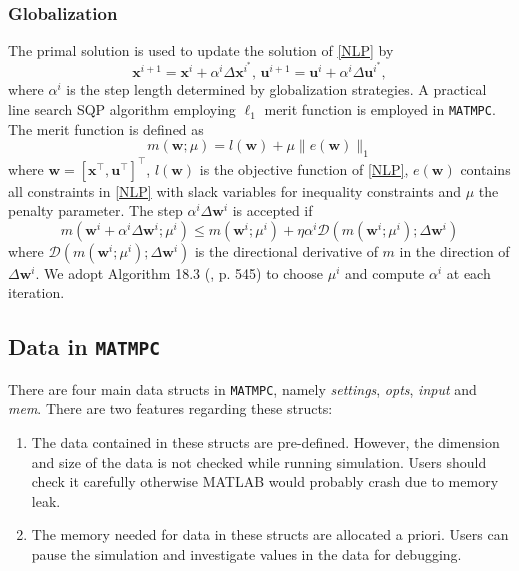 \documentclass{article}
\newcommand{\software}[1]{{\tt#1}}
\newcommand{\norm}[1]{\lVert#1\rVert}
\newcommand{\alert}[1]{{\textit{#1}}}
\begin{document}
\subsubsection{Globalization}
The primal solution is used to update the solution of \eqref{NLP} by
\begin{equation}\label{solution update}
\mathbf{x}^{i+1} = \mathbf{x}^{i} + \alpha^i \Delta\mathbf{x}^{i^*}, \, \mathbf{u}^{i+1} = \mathbf{u}^{i} + \alpha^i \Delta\mathbf{u}^{i^*},
\end{equation}
where $\alpha^i$ is the step length determined by globalization strategies. A practical line search SQP algorithm employing $\ell_1$ merit function \cite{nocedal2006numerical} is employed in \software{MATMPC}. The merit function is defined as
\begin{equation}
m(\mathbf{w};\mu)=l(\mathbf{w})+\mu\norm{e(\mathbf{w})}_1
\end{equation}
where $\mathbf{w}=[\mathbf{x}^\top,\mathbf{u}^\top]^\top$, $l(\mathbf{w})$ is the objective function of \eqref{NLP}, $e(\mathbf{w})$ contains all constraints in \eqref{NLP} with slack variables for inequality constraints and $\mu$ the penalty parameter. The step $\alpha^i\Delta \mathbf{w}^i$ is accepted if 
\begin{equation}
m(\mathbf{w}^i+\alpha^i\Delta \mathbf{w}^i;\mu^i)\leq m(\mathbf{w}^i;\mu^i)+\eta\alpha^i\mathcal{D}(m(\mathbf{w}^i;\mu^i);\Delta \mathbf{w}^i)
\end{equation}
where $\mathcal{D}(m(\mathbf{w}^i;\mu^i);\Delta \mathbf{w}^i)$ is the directional derivative of $m$ in the direction of $\Delta \mathbf{w}^i$. We adopt Algorithm 18.3 (\cite{nocedal2006numerical}, p. 545) to choose $\mu^i$ and compute $\alpha^i$ at each iteration.

\subsection{Data in \software{MATMPC}}
There are four main data structs in \software{MATMPC}, namely \alert{settings}, \alert{opts}, \alert{input} and \alert{mem}. There are two features regarding these structs:
\begin{enumerate}
	\item The data contained in these structs are pre-defined. However, the dimension and size of the data is not checked while running simulation. Users should check it carefully otherwise MATLAB would probably crash due to memory leak.
	\item The memory needed for data in these structs are allocated a priori. Users can pause the simulation and investigate values in the data for debugging.
\end{enumerate}
\end{document}
